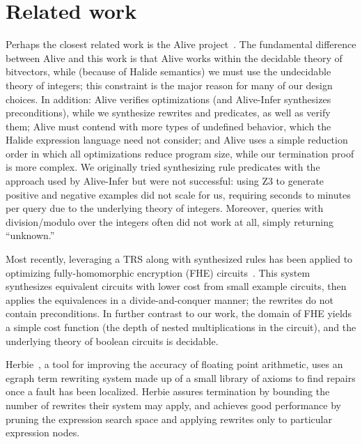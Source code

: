 \section{Related work}
\label{sec:related}

Perhaps the closest related work is the Alive project~\citep{lopes2015alive,menendez2017aliveinfer}.
The fundamental difference between Alive and this
work is that Alive works within the decidable theory of bitvectors, while
(because of Halide semantics) we must use the undecidable theory of integers;
this constraint is the major reason for many of our design choices. In addition:
Alive verifies optimizations (and Alive-Infer synthesizes preconditions), while
we synthesize rewrites and predicates, as well as verify them; Alive must contend
with more types of undefined behavior, which the Halide expression
language need not consider; and Alive uses a simple reduction order in
which all optimizations reduce program size, while our termination proof is more
complex. We originally tried synthesizing rule predicates with the approach used
by Alive-Infer but were not successful: using Z3 to generate positive and
negative examples did not scale for us, requiring seconds to minutes per query
due to the underlying theory of integers.  Moreover, queries with
division/modulo over the integers often did not work at all, simply returning
``unknown.''

Most recently, leveraging a TRS along with synthesized rules has been applied
to optimizing fully-homomorphic encryption (FHE) circuits~\citep{lee2020fhe}.  This
system synthesizes equivalent circuits with lower cost from small example circuits,
then applies the equivalences in a divide-and-conquer manner; the rewrites do
not contain preconditions. In further contrast to our work, the domain of FHE yields a
simple cost function (the depth of nested multiplications in the circuit), and
the underlying theory of boolean circuits is decidable.

Herbie~\citep{panchekha2015automatically}, a tool for improving the accuracy of floating point arithmetic, uses an egraph term rewriting system made up of a small library of axioms to find repairs once a fault has been localized. Herbie assures termination by bounding the number of rewrites their system may apply, and achieves good performance by pruning the expression search space and applying rewrites only to particular expression nodes. 

